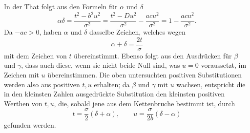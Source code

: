 \documentclass[11pt]{article}
\begin{document}
In der That folgt aus den Formeln für $\alpha$ und $\delta$
\[
 \alpha\delta=\frac{t^2-b^2u^2}{\sigma^2}
 =\frac{t^2-Du^2}{\sigma^2}-\frac{ac u^2}{\sigma^2}
 =1-
\frac{ac u^2}{\sigma^2}.
\]
Da $-ac>0$, haben $\alpha$ und $\delta$ dasselbe Zeichen, welches wegen
\[
 \alpha+\delta=\frac{2t}{\sigma}
\]
mit dem Zeichen von $t$ übereinstimmt. Ebenso folgt aus den Ausdrücken für $\beta$ und $\gamma$, dass auch diese, wenn sie nicht beide Null sind, was $u=0$ voraussetzt, im Zeichen mit $u$ übereinstimmen. Die oben untersuchten positiven Substitutionen werden also aus positiven $t,u$ erhalten; da $\beta$ und $\gamma$ mit $u$ wachsen, entspricht die in den kleinsten Zahlen ausgedrückte Substitution den kleinsten positiven Werthen von $t,u$, die, sobald jene aus dem Kettenbruche bestimmt ist, durch
\[
 t=\frac{\sigma}{2}(\delta+\alpha),
 \qquad
 u=\frac{\sigma}{2b}(\delta-
\alpha)
\]
gefunden werden.
\end{document}
